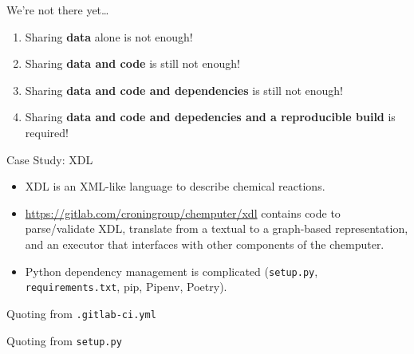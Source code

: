 \documentclass[xcolor={table,usenames,dvipsnames},aspectratio=169]{beamer}
\begin{document}
\begin{frame}{We're not there yet\dots}
  \begin{enumerate}
    \item<1->{Sharing \textbf<1>{data} alone is not enough!}
    \item<2->{Sharing \textbf<2>{data and code} is still not enough!}
    \item<3->{Sharing \textbf<3>{data and code and dependencies} is still not enough!}
    \item<4->{Sharing \textbf<4>{data and code and depedencies and a reproducible build} is required!}
  \end{enumerate}
\end{frame}

\begin{frame}[allowframebreaks]{Case Study: XDL}

\begin{itemize}
\item{XDL is an XML-like language to describe chemical reactions.}
\item{\url{https://gitlab.com/croningroup/chemputer/xdl}
contains code to parse/validate XDL, translate from a textual to a graph-based
representation, and an executor that interfaces with other components of the
chemputer.
}
\item{Python dependency management is complicated
(\texttt{setup.py}, \texttt{requirements.txt}, pip, Pipenv, Poetry).}
\end{itemize}

\framebreak

Quoting from \texttt{.gitlab-ci.yml}


Quoting from \texttt{setup.py}

\end{frame}
\end{document}
